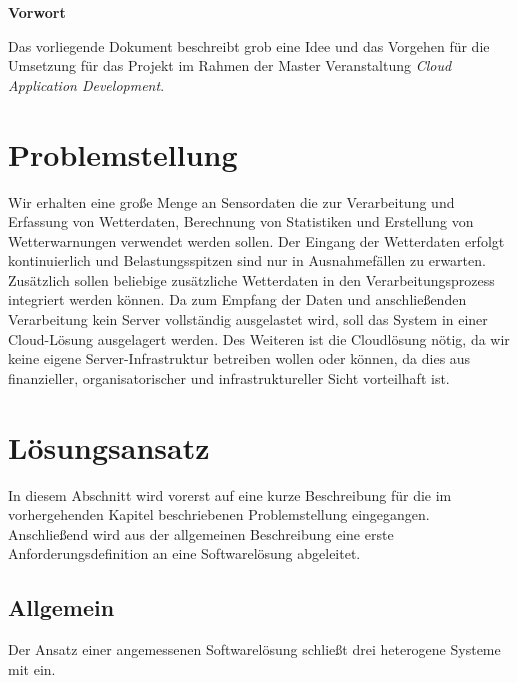 \documentclass[paper,oneside,onecolumn,notitlepage,bibtotocnumbered,fontsize=12pt,bigheadings,ngerman]{scrartcl}
\newcommand{\sectionnumbering}[1]{%
  \setcounter{section}{0}%
   \renewcommand{\thesection}{\csname #1\endcsname{section}}}
\begin{document}




{\Large \textbf{Vorwort}}
\bigskip

Das vorliegende Dokument beschreibt grob eine Idee und das Vorgehen für die Umsetzung für das Projekt im Rahmen der Master Veranstaltung \textit{Cloud Application Development}.




\normalsize


\setlength{\parindent}{0pt}

\newpage
\sectionnumbering{Roman} 
\tableofcontents
\clearpage

\listoffigures 
\clearpage 

\listoftables 
\clearpage
{} 
\sectionnumbering{arabic} 

\section{Problemstellung}
Wir erhalten eine große Menge an Sensordaten die zur Verarbeitung und Erfassung von Wetterdaten, Berechnung von Statistiken und Erstellung von Wetterwarnungen verwendet werden sollen. Der Eingang der Wetterdaten erfolgt kontinuierlich und Belastungsspitzen sind nur in Ausnahmefällen zu erwarten. Zusätzlich sollen beliebige zusätzliche Wetterdaten in den Verarbeitungsprozess integriert werden können. 
Da zum Empfang der Daten und anschließenden Verarbeitung kein Server vollständig ausgelastet wird, soll das System in einer Cloud-Lösung ausgelagert werden. 
Des Weiteren ist die Cloudlösung nötig, da wir keine eigene Server-Infrastruktur betreiben wollen oder können, da dies aus finanzieller, organisatorischer und infrastruktureller Sicht vorteilhaft ist.

\section{Lösungsansatz}
In diesem Abschnitt wird vorerst auf eine kurze Beschreibung für die im vorhergehenden Kapitel beschriebenen Problemstellung eingegangen. Anschließend wird aus  der allgemeinen Beschreibung eine erste Anforderungsdefinition an eine Softwarelösung abgeleitet.
\subsection{Allgemein}
Der Ansatz einer angemessenen Softwarelösung schließt drei heterogene Systeme mit ein. 
\end{document}
